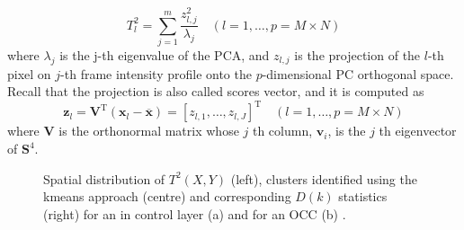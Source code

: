 \begin{equation}
T_l^2=\sum_{j=1}^m \frac{z_{l, j}^2}{\lambda_j} \quad(l=1, \ldots, p=M \times N)
\end{equation}
where $\lambda_j$ is the j-th eigenvalue of the PCA, and $z_{l, j}$ is the  projection of the $l$-th pixel on $j$-th frame intensity profile onto the $p$-dimensional PC orthogonal space. Recall that the projection is also called scores vector, and it is computed as
\begin{equation}
\mathbf{z}_l=\mathbf{V}^{\mathrm{T}}\left(\mathbf{x}_l-\overline{\mathbf{x}}\right)=\left[z_{l, 1}, \ldots, z_{l, J}\right]^{\mathrm{T}} \quad(l=1, \ldots, p=M \times N)
\end{equation}
where $\mathbf{V}$ is the orthonormal matrix whose $j$ th column, $\boldsymbol{v}_i$, is the $j$ th eigenvector of $\mathbf{S}^4$.
\begin{figure}
    \centering
    \qquad
    \caption[T-PCA approach for HS detection.]{Spatial distribution of $T^2(X,Y)$ (left), clusters identified using the kmeans approach (centre) and corresponding $D(k)$ statistics (right) for an in control layer (a) and for an OCC (b) \cite{grasso_-process_2017}.}
\end{figure}
